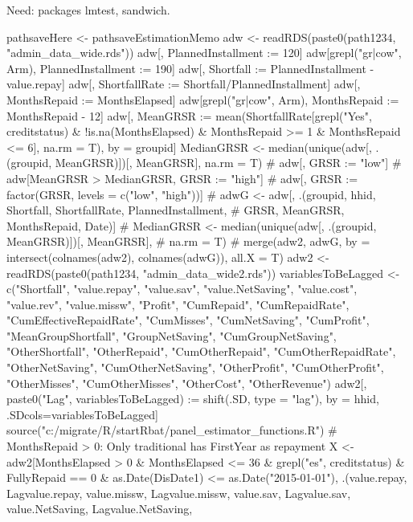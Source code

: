 \setcounter{tocdepth}{3}
\tableofcontents
\newpage

\setlength{\parindent}{1em}
\vspace{2ex}

Need: packages \textsf{lmtest, sandwich}.





\begin{Schunk}
\begin{Sinput}
pathsaveHere <- pathsaveEstimationMemo
adw <- readRDS(paste0(path1234, "admin_data_wide.rds"))
adw[, PlannedInstallment := 120]
adw[grepl("gr|cow", Arm), PlannedInstallment := 190]
adw[, Shortfall := PlannedInstallment - value.repay]
adw[, ShortfallRate := Shortfall/PlannedInstallment]
adw[, MonthsRepaid := MonthsElapsed]
adw[grepl("gr|cow", Arm), MonthsRepaid := MonthsRepaid - 12]
adw[, MeanGRSR := mean(ShortfallRate[grepl("Yes", creditstatus) & 
    !is.na(MonthsElapsed) & MonthsRepaid >= 1 & MonthsRepaid <= 6], 
  na.rm = T), by = groupid]
MedianGRSR <- median(unique(adw[, .(groupid, MeanGRSR)])[, MeanGRSR], 
  na.rm = T)
# adw[, GRSR := "low"]
# adw[MeanGRSR > MedianGRSR, GRSR := "high"]
# adw[, GRSR := factor(GRSR, levels = c("low", "high"))]
# adwG <- adw[, .(groupid, hhid, Shortfall, ShortfallRate, PlannedInstallment, 
#   GRSR, MeanGRSR, MonthsRepaid, Date)]
# MedianGRSR <- median(unique(adw[, .(groupid, MeanGRSR)])[, MeanGRSR], 
#   na.rm = T)
# merge(adw2, adwG, by = intersect(colnames(adw2), colnames(adwG)), all.X = T)
adw2 <- readRDS(paste0(path1234, "admin_data_wide2.rds"))
variablesToBeLagged <- 
  c("Shortfall", "value.repay", "value.sav", "value.NetSaving", 
   "value.cost", "value.rev", "value.missw", "Profit",
   "CumRepaid", "CumRepaidRate", "CumEffectiveRepaidRate", "CumMisses", 
   "CumNetSaving", "CumProfit",
    "MeanGroupShortfall", "GroupNetSaving", "CumGroupNetSaving", 
    "OtherShortfall", "OtherRepaid", "CumOtherRepaid", "CumOtherRepaidRate",
    "OtherNetSaving", "CumOtherNetSaving", "OtherProfit", "CumOtherProfit",
    "OtherMisses", "CumOtherMisses", "OtherCost", "OtherRevenue")
adw2[, paste0("Lag", variablesToBeLagged) :=  
  shift(.SD, type = "lag"), by = hhid, .SDcols=variablesToBeLagged]
source("c:/migrate/R/startRbat/panel_estimator_functions.R")
# MonthsRepaid > 0: Only traditional has FirstYear as repayment
X <- adw2[MonthsElapsed > 0 & MonthsElapsed <= 36 & 
    grepl("es", creditstatus) & FullyRepaid == 0 & as.Date(DisDate1) <= as.Date("2015-01-01"),
    .(value.repay, Lagvalue.repay, value.missw, Lagvalue.missw,
    value.sav, Lagvalue.sav, value.NetSaving, Lagvalue.NetSaving,  

\end{Sinput}
\end{Schunk}
